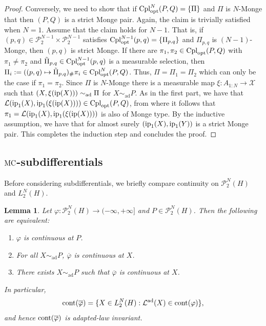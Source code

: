 \documentclass[a4paper]{amsart}
\numberwithin{theorem}{section}
\newtheorem{lemma}[theorem]{Lemma}
\theoremstyle{definition}
\newcommand{\law}{\mathcal{L}}
\newcommand{\cpl}{\textup{Cpl}}
\newcommand{\Pc}{\mathcal P}
\newcommand{\cont}{\textup{cont}}
\newcommand{\cplopt}{\cpl_{\rm opt}}
\newcommand{\simad}{\sim_{\mathrm{ad}}}
\renewcommand{\H}{H}
\renewcommand{\phi}{\varphi}
\newcommand{\mc}{\textup{MC}}
\newcommand{\ip}{\textup{ip}}
\newcommand{\lawad}{\law^{\textup{ad}}}
\begin{document}
\begin{proof}
    Conversely, we need to show that if $\cplopt^N(P,Q)= \{\Pi\}$ and $\Pi$ is $N$-Monge that then $(P,Q)$ is a strict Monge pair.
    Again, the claim is trivially satisfied when $N = 1$. Assume that the claim holds for $N-1$. That is, if $(p,q) \in \Pc_2^{N-1} \times \Pc_2^{N-1}$ satisfies $\cplopt^{N-1}(p,q) = \{ \Pi_{p,q} \}$ and $\Pi_{p,q}$ is $(N-1)$-Monge, then $(p,q)$ is strict Monge.
    If there are $\pi_1, \pi_2 \in \cplopt(P,Q)$ with $\pi_1 \neq \pi_2$ and $\tilde \Pi_{p,q} \in \cplopt^{N-1}(p,q)$ is a measurable selection, then $\Pi_i := ((p,q) \mapsto \tilde \Pi_{p,q})_\# \pi_i \in \cplopt^N(P,Q)$. Thus, $\Pi = \Pi_1 = \Pi_2$ which can only be the case if $\pi_1 = \pi_2$.
    Since $\Pi$ is $N$-Monge there is a measurable map $\xi : A_{1:N} \to \mathcal X$ such that $(X,\xi(\ip(X))) \simad \Pi$ for $X \simad P$.
    As in the first part, we have that $\law(\ip_1(X), \ip_1(\xi(\ip(X)))) \in \cplopt(P,Q)$, from where it follows that $\pi_1 = \law(\ip_1(X), \ip_1(\xi(\ip(X))))$ is also of Monge type.
    By the inductive assumption, we have that for almost surely $(\ip_1(X),\ip_1(Y))$ is a strict Monge pair.
    This completes the induction step and concludes the proof.
\end{proof} 









\subsection{$\mc$-subdifferentials}
Before considering subdifferentials, we briefly compare continuity on $\Pc_2^N(H)$ and $L_2^N(H).$ \begin{lemma}\label{lem:continuity_lift} 
Let $\phi : \Pc_2^N(\H) \to (-\infty, +\infty]$ and $P \in \Pc_2^N(\H)$. Then the following are equivalent:
\begin{enumerate}
    \item $\phi$ is continuous at $P$.
    \item For all $X \simad P$,  $\overline{\phi}$ is continuous at $X$.
    \item There exists $X \simad P$ such that $\overline{\phi}$ is continuous at $X$.  
\end{enumerate}
In particular, 
\[
\cont(\overline{\phi}) = \{ X \in L_2^N(\H) : \lawad(X) \in \cont(\phi) \},
\]
and hence 
$\cont(\overline{\phi})$ is adapted-law invariant.  
\end{lemma}
\end{document}
